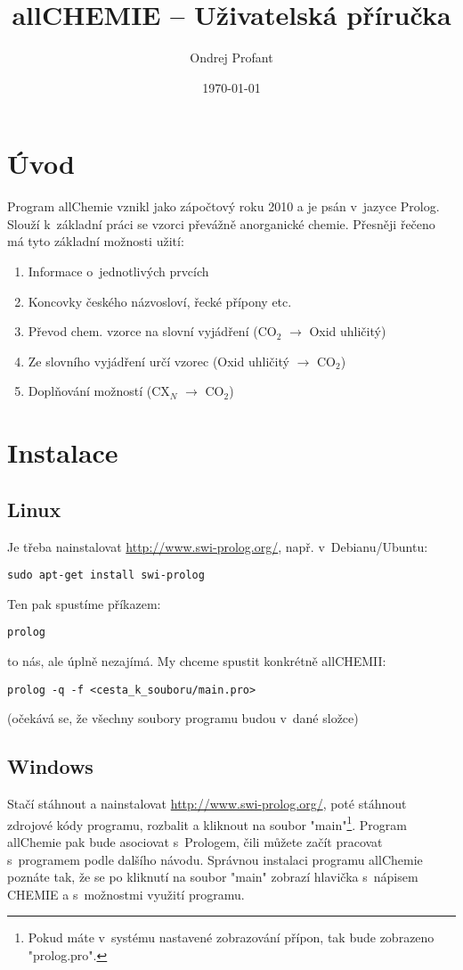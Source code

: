\documentclass[a4paper]{article}
\title{allCHEMIE -- Uživatelská příručka}
\author{Ondrej Profant}
\date{\today}
\begin{document}
\maketitle
\newpage
\tableofcontents
\newpage
\section{Úvod}
Program allChemie vznikl jako zápočtový roku 2010 a je psán v~jazyce Prolog. Slouží k~základní práci se vzorci převážně anorganické chemie. Přesněji řečeno má tyto základní možnosti užití:
\begin{enumerate}
\item Informace o~jednotlivých prvcích
\item Koncovky českého názvosloví, řecké přípony etc.
\item Převod chem. vzorce na slovní vyjádření (CO$_2$ $\rightarrow$ Oxid uhličitý)
\item Ze slovního vyjádření určí vzorec (Oxid uhličitý $\rightarrow$ CO$_2$)
\item Doplňování možností (CX$_N$ $\rightarrow$ CO$_2$)

\end{enumerate}
\section{Instalace} 
\subsection{Linux}
Je třeba nainstalovat \href{swi-prolog}{http://www.swi-prolog.org/}, např. v~Debianu/Ubuntu:
\begin{verbatim}
sudo apt-get install swi-prolog
\end{verbatim}
Ten pak spustíme příkazem:
\begin{verbatim}
prolog
\end{verbatim}
to nás, ale úplně nezajímá. My chceme spustit konkrétně allCHEMII:
\begin{verbatim}
prolog -q -f <cesta_k_souboru/main.pro>
\end{verbatim}
(očekává se, že všechny soubory programu budou v~dané složce)
\subsection{Windows}
Stačí stáhnout a nainstalovat \href{swi-prolog}{http://www.swi-prolog.org/}, poté stáhnout zdrojové kódy programu, rozbalit a kliknout na soubor "main"\footnote{Pokud máte v~systému nastavené zobrazování přípon, tak bude zobrazeno "prolog.pro".}. Program allChemie pak bude asociovat s~Prologem, čili můžete začít pracovat s~programem podle dalšího návodu. Správnou instalaci programu allChemie poznáte tak, že se po kliknutí na soubor "main" zobrazí hlavička s~nápisem CHEMIE a s~možnostmi využití programu.
\end{document}

